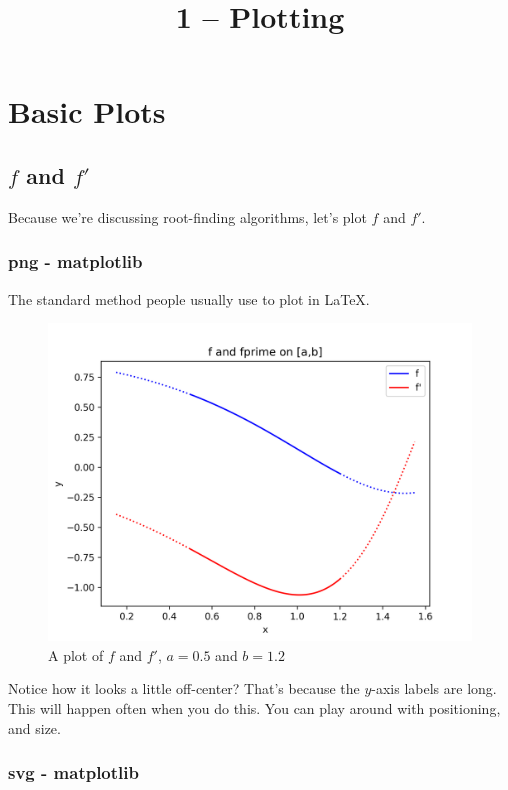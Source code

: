 \documentclass{article}
\title{1 -- Plotting}
\begin{document}
\maketitle

\section{Basic Plots}
\subsection{$f$ and $f'$}

Because we're discussing root-finding algorithms, let's plot $f$ and $f'$.

\subsubsection{png - matplotlib}

The standard method people usually use to plot in LaTeX.

\begin{figure}[h]
  \centering
  \includegraphics[scale=0.8]{./plots/ffp}
  \caption{A plot of $f$ and $f'$, $a = 0.5$ and $b = 1.2$}
\end{figure}

Notice how it looks a little off-center?
That's because the $y$-axis labels are long.
This will happen often when you do this.
You can play around with positioning, and size.


\subsubsection{svg - matplotlib}
\end{document}
